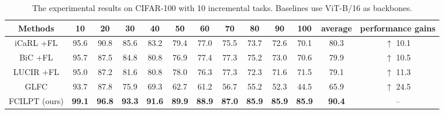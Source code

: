 \documentclass[sigconf,anonymous,review,screen]{acmart}
\begin{document}
\begin{table*}\footnotesize
	\centering
	\caption{The experimental results on CIFAR-100 with 10 incremental tasks. Baselines use ViT-B/16 as backbones.}
	\label{tab:5}{
		\begin{tabular}{ccccccccccccc}
			\toprule
			Methods & 10 & 20 & 30 & 40 & 50 & 60 & 70 & 80 & 90 & 100 & average & performance gains \\
			\midrule
			iCaRL \cite{rebuffi2017icarl}+FL  & 95.6 & 90.8 & 85.6 & 83.2 & 79.4 & 77.0 & 75.5 & 73.7 & 72.6 & 70.1 & 80.3 & $\uparrow$ 10.1  \\
			BiC \cite{wu2019large}+FL & 95.7 & 87.5 & 84.8 & 80.8 & 76.9 & 77.4 & 77.3 & 75.2 & 73.0 & 70.6 & 79.9 & $\uparrow$ 10.5 \\
			LUCIR \cite{hou2019learning}+FL & 95.0 & 87.2 & 81.6 & 80.8 & 78.0 & 76.3 & 77.3 & 72.3 & 71.6 & 71.5 & 79.1 & $\uparrow$ 11.3 \\
			GLFC \cite{dong2022federated} & 93.7 & 87.8 & 75.9 & 69.3 & 62.7 & 61.2 & 56.7 & 55.2 & 52.3 & 44.5 & 65.9 & $\uparrow$ 24.5 \\
			FCILPT (ours) & \textbf{99.1} & \textbf{96.8} & \textbf{93.3} & \textbf{91.6} & \textbf{89.9} & \textbf{88.9} & \textbf{87.0} & \textbf{85.9} & \textbf{85.9} & \textbf{85.9} & \textbf{90.4} & -- \\
			\bottomrule
	\end{tabular}	}
\end{table*}
\end{document}
